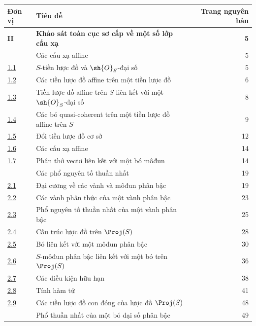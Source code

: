 \documentclass[oneside,10pt]{amsart}
\begin{document}
\begingroup
\small
\renewcommand{\arraystretch}{1.04}
\begin{longtable}{@{}p{}p{}r@{}}
\textbf{Đơn vị} & \textbf{Tiêu đề} & \textbf{Trang nguyên bản}\\
\hline
\textbf{II} & \textbf{Khảo sát toàn cục sơ cấp về một số lớp cấu xạ} & \textbf{5}\\
\hyperref[section:II.1]{\textsection1} & Các cấu xạ affine & 5\\
\hyperref[subsection:II.1.1]{1.1} & $S$-tiền lược đồ và $\sh{O}_S$-đại số & 5\\
\hyperref[subsection:II.1.2]{1.2} & Các tiền lược đồ affine trên một tiền lược đồ & 6\\
\hyperref[subsection:II.1.3]{1.3} & Tiền lược đồ affine trên $S$ liên kết với một $\sh{O}_S$-đại số & 8\\
\hyperref[subsection:II.1.4]{1.4} & Các bó quasi-coherent trên một tiền lược đồ affine trên $S$ & 9\\
\hyperref[subsection:II.1.5]{1.5} & Đổi tiền lược đồ cơ sở & 12\\
\hyperref[subsection:II.1.6]{1.6} & Các cấu xạ affine & 14\\
\hyperref[subsection:II.1.7]{1.7} & Phân thớ vectơ liên kết với một bó môđun & 14\\
\hyperref[section:II.2]{\textsection2} & Các phổ nguyên tố thuần nhất & 19\\
\hyperref[subsection:II.2.1]{2.1} & Đại cương về các vành và môđun phân bậc & 19\\
\hyperref[subsection:II.2.2]{2.2} & Các vành phân thức của một vành phân bậc & 23\\
\hyperref[subsection:II.2.3]{2.3} & Phổ nguyên tố thuần nhất của một vành phân bậc & 25\\
\hyperref[subsection:II.2.4]{2.4} & Cấu trúc lược đồ trên $\Proj(S)$ & 28\\
\hyperref[subsection:II.2.5]{2.5} & Bó liên kết với một môđun phân bậc & 30\\
\hyperref[subsection:II.2.6]{2.6} & $S$-môđun phân bậc liên kết với một bó trên $\Proj(S)$ & 36\\
\hyperref[subsection:II.2.7]{2.7} & Các điều kiện hữu hạn & 38\\
\hyperref[subsection:II.2.8]{2.8} & Tính hàm tử & 41\\
\hyperref[subsection:II.2.9]{2.9} & Các tiền lược đồ con đóng của lược đồ $\Proj(S)$ & 48\\
\hyperref[section:II.3]{\textsection3} & Phổ thuần nhất của một bó đại số phân bậc & 49\\

\end{longtable}
\end{document}
